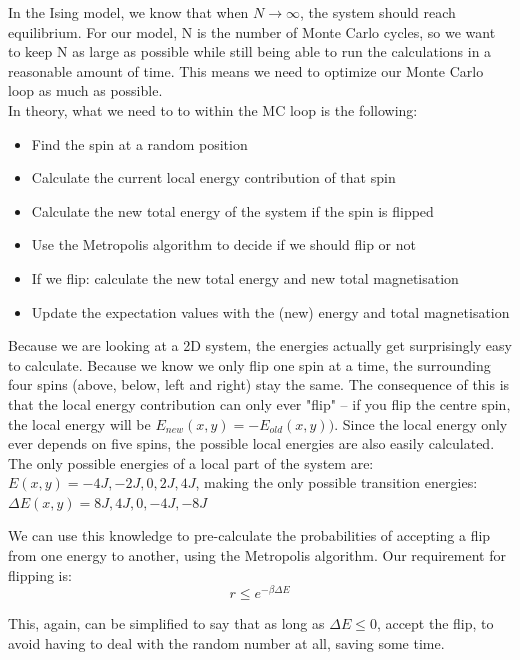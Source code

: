 \documentclass{article}
\begin{document}
		In the Ising model, we know that when $N \rightarrow \infty$, the system should reach equilibrium. For our model, N is the number of Monte Carlo cycles, so we want to keep N as large as possible while still being able to run the calculations in a reasonable amount of time. This means we need to optimize our Monte Carlo loop as much as possible.\\

		In theory, what we need to to within the MC loop is the following:
		\begin{itemize}
			\item Find the spin at a random position
			\item Calculate the current local energy contribution of that spin
			\item Calculate the new total energy of the system if the spin is flipped
			\item Use the Metropolis algorithm to decide if we should flip or not
			\item If we flip: calculate the new total energy and new total magnetisation
			\item Update the expectation values with the (new) energy and total magnetisation
		\end{itemize}

		Because we are looking at a 2D system, the energies actually get surprisingly easy to calculate. Because we know we only flip one spin at a time, the surrounding four spins (above, below, left and right) stay the same. The consequence of this is that the local energy contribution can only ever "flip" – if you flip the centre spin, the local energy will be $E_{new}(x,y) = -E_{old}(x,y))$. Since the local energy only ever depends on five spins, the possible local energies are also easily calculated. The only possible energies of a local part of the system are: $E(x,y) = {-4J, -2J, 0, 2J, 4J}$, making the only possible transition energies: $\Delta E(x,y) = {8J, 4J, 0, -4J, -8J}$

		We can use this knowledge to pre-calculate the probabilities of accepting a flip from one energy to another, using the Metropolis algorithm. Our requirement for flipping is:
		\begin{equation}
			r \leq e^{-\beta \Delta E}
		\end{equation}

		This, again, can be simplified to say that as long as $\Delta E \leq 0$, accept the flip, to avoid having to deal with the random number at all, saving some time.
\end{document}
